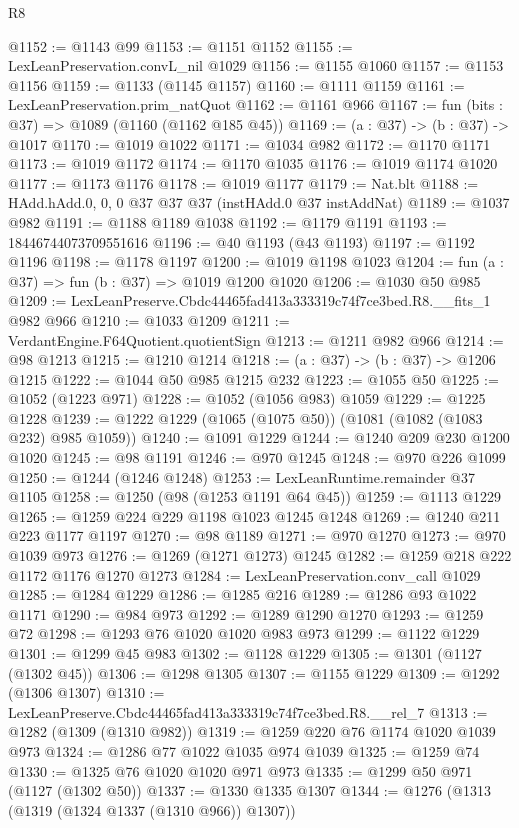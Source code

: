 \begin{lexlean}{R8}
\begin{coremodule}
@1152 := @1143 @99
@1153 := @1151 @1152
@1155 := LexLeanPreservation.convL_nil @1029
@1156 := @1155 @1060
@1157 := @1153 @1156
@1159 := @1133 (@1145 @1157)
@1160 := @1111 @1159
@1161 := LexLeanPreservation.prim_natQuot
@1162 := @1161 @966
@1167 := fun (bits : @37) => @1089 (@1160 (@1162 @185 @45))
@1169 := (a : @37) -> (b : @37) -> @1017
@1170 := @1019 @1022
@1171 := @1034 @982
@1172 := @1170 @1171
@1173 := @1019 @1172
@1174 := @1170 @1035
@1176 := @1019 @1174 @1020
@1177 := @1173 @1176
@1178 := @1019 @1177
@1179 := Nat.blt
@1188 := HAdd.hAdd.{0, 0, 0} @37 @37 @37 (instHAdd.{0} @37 instAddNat)
@1189 := @1037 @982
@1191 := @1188 @1189 @1038
@1192 := @1179 @1191
@1193 := 18446744073709551616
@1196 := @40 @1193 (@43 @1193)
@1197 := @1192 @1196
@1198 := @1178 @1197
@1200 := @1019 @1198 @1023
@1204 := fun (a : @37) => fun (b : @37) => @1019 @1200 @1020
@1206 := @1030 @50 @985
@1209 := LexLeanPreserve.Cbdc44465fad413a333319c74f7ce3bed.R8.__fits_1 @982 @966
@1210 := @1033 @1209
@1211 := VerdantEngine.F64Quotient.quotientSign
@1213 := @1211 @982 @966
@1214 := @98 @1213
@1215 := @1210 @1214
@1218 := (a : @37) -> (b : @37) -> @1206 @1215
@1222 := @1044 @50 @985 @1215 @232
@1223 := @1055 @50
@1225 := @1052 (@1223 @971)
@1228 := @1052 (@1056 @983) @1059
@1229 := @1225 @1228
@1239 := @1222 @1229 (@1065 (@1075 @50)) (@1081 (@1082 (@1083 @232) @985 @1059))
@1240 := @1091 @1229
@1244 := @1240 @209 @230 @1200 @1020
@1245 := @98 @1191
@1246 := @970 @1245
@1248 := @970 @226 @1099
@1250 := @1244 (@1246 @1248)
@1253 := LexLeanRuntime.remainder @37 @1105
@1258 := @1250 (@98 (@1253 @1191 @64 @45))
@1259 := @1113 @1229
@1265 := @1259 @224 @229 @1198 @1023 @1245 @1248
@1269 := @1240 @211 @223 @1177 @1197
@1270 := @98 @1189
@1271 := @970 @1270
@1273 := @970 @1039 @973
@1276 := @1269 (@1271 @1273) @1245
@1282 := @1259 @218 @222 @1172 @1176 @1270 @1273
@1284 := LexLeanPreservation.conv_call @1029
@1285 := @1284 @1229
@1286 := @1285 @216
@1289 := @1286 @93 @1022 @1171
@1290 := @984 @973
@1292 := @1289 @1290 @1270
@1293 := @1259 @72
@1298 := @1293 @76 @1020 @1020 @983 @973
@1299 := @1122 @1229
@1301 := @1299 @45 @983
@1302 := @1128 @1229
@1305 := @1301 (@1127 (@1302 @45))
@1306 := @1298 @1305
@1307 := @1155 @1229
@1309 := @1292 (@1306 @1307)
@1310 := LexLeanPreserve.Cbdc44465fad413a333319c74f7ce3bed.R8.__rel_7
@1313 := @1282 (@1309 (@1310 @982))
@1319 := @1259 @220 @76 @1174 @1020 @1039 @973
@1324 := @1286 @77 @1022 @1035 @974 @1039
@1325 := @1259 @74
@1330 := @1325 @76 @1020 @1020 @971 @973
@1335 := @1299 @50 @971 (@1127 (@1302 @50))
@1337 := @1330 @1335 @1307
@1344 := @1276 (@1313 (@1319 (@1324 @1337 (@1310 @966)) @1307))

\end{coremodule}
\end{lexlean}
